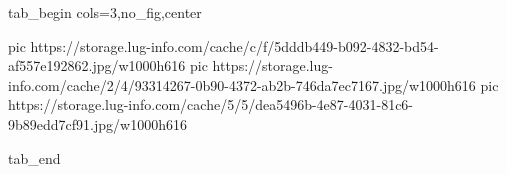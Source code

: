  
 
 
 
 


\ifcmt
  tab_begin cols=3,no_fig,center

     pic https://storage.lug-info.com/cache/c/f/5dddb449-b092-4832-bd54-af557e192862.jpg/w1000h616
		 pic https://storage.lug-info.com/cache/2/4/93314267-0b90-4372-ab2b-746da7ec7167.jpg/w1000h616
		 pic https://storage.lug-info.com/cache/5/5/dea5496b-4e87-4031-81c6-9b89edd7cf91.jpg/w1000h616

  tab_end
\fi
